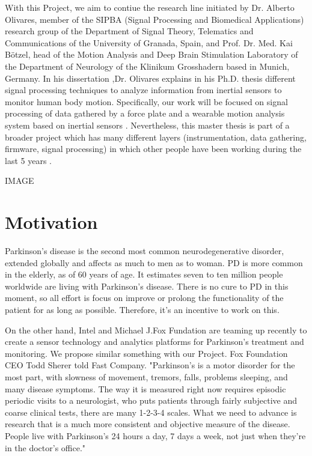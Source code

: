 With this Project, we aim  to contiue the research line initiated by Dr. Alberto Olivares, member of the SIPBA (Signal Processing and Biomedical Applications) research group of the Department of Signal Theory, Telematics and Communications of the University of Granada, Spain, and Prof. Dr. Med. Kai Bötzel, head of the Motion Analysis and Deep Brain Stimulation Laboratory of the Department of Neurology of the Klinikum Grosshadern based in Munich, Germany. In his dissertation ,Dr. Olivares explains in his Ph.D. thesis \cite{A.Olivares2013} different signal processing techniques to analyze information from inertial sensors to monitor human body motion.
Specifically, our work will be focused on signal processing of data gathered  by a force plate and a wearable motion analysis system based on inertial sensors . Nevertheless, this master thesis is part of a broader project which has many different layers (instrumentation, data gathering, firmware, signal processing) in which other people have been working during the last 5 years .

 IMAGE 

\section{Motivation}
Parkinson’s disease is the second most common neurodegenerative disorder, extended globally and affects as much to men as to woman. PD is more common in the elderly, as of 60 years of age. It estimates seven  to ten million people worldwide are living with Parkinson’s disease. There is no cure to PD in this moment, so all effort is focus on improve or prolong the functionality of the patient for as long as possible. Therefore, it’s an incentive to work on this. \cite{ParkinsonDisease}\cite{pdf}

On the other hand, Intel and Michael J.Fox Fundation are teaming up recently to create a sensor technology and analytics platforms for Parkinson’s treatment and monitoring. We propose similar something with our Project. Fox Foundation CEO Todd Sherer told Fast Company. "Parkinson’s is a motor disorder for the most part, with slowness of movement, tremors, falls, problems sleeping, and many disease symptoms. The way it is measured right now requires episodic periodic visits to a neurologist, who puts patients through fairly subjective and coarse clinical tests, there are many 1-2-3-4 scales. What we need to advance is research that is a much more consistent and objective measure of the disease. People live with Parkinson’s 24 hours a day, 7 days a week, not just when they're in the doctor’s office."

